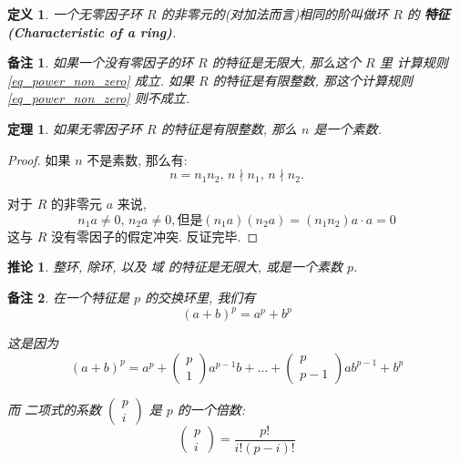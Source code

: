 \documentclass[utf8]{ctexbook}
\newtheorem{theorem}{定理}[section]
\newtheorem{definition}{定义}[section]
\newtheorem{memo}{备注}[section]
\newtheorem{corollary}{推论}[section]
\begin{document}
\begin{definition}
一个无零因子环 $R$ 的非零元的(对加法而言)相同的阶叫做环 $R$ 的 \textbf{特征(Characteristic of a ring)}.
\end{definition}

\begin{memo}
如果一个没有零因子的环 $R$ 的特征是无限大, 那么这个 $R$ 里 计算规则 \ref{eq_power_non_zero} 成立. 如果 $R$ 的特征是有限整数, 那这个计算规则 \ref{eq_power_non_zero} 则不成立.
\end{memo}

\begin{theorem}
如果无零因子环 $R$ 的特征是有限整数, 那么 $n$ 是一个素数.
\end{theorem}

\begin{proof}
如果 $n$ 不是素数, 那么有:
\begin{equation}
n = n_1 n_2, \, n \nmid n_1, \, n \nmid n_2.
\end{equation}

对于 $R$ 的非零元 $a$ 来说,
\begin{equation}
n_1 a \neq 0, \, n_2 a \neq 0, 但是 (n_1 a)(n_2 a) = (n_1 n_2) a \cdot a = 0
\end{equation}
这与 $R$ 没有零因子的假定冲突. 反证完毕.
\end{proof}

\begin{corollary}
整环, 除环, 以及 域 的特征是无限大, 或是一个素数 $p$.
\end{corollary}

\begin{memo}
在一个特征是 $p$ 的交换环里, 我们有
\begin{equation}
(a+b)^p = a^p + b^p
\end{equation}

这是因为
\begin{equation}
(a+b)^p = a^p + \left( \begin{array}{c}
p \\
1
\end{array} \right) a^{p-1} b + \ldots + \left( \begin{array}{c}
p \\
p-1
\end{array} \right) a b^{p-1} + b^p
\end{equation}

而 二项式的系数 $\left( \begin{array}{c}
p \\
i
\end{array} \right)$ 是 $p$ 的一个倍数:
\begin{equation}
\left( \begin{array}{c}
p \\
i
\end{array} \right) = \frac{p!}{i! (p-i)!}
\end{equation}
\end{memo}
\end{document}
